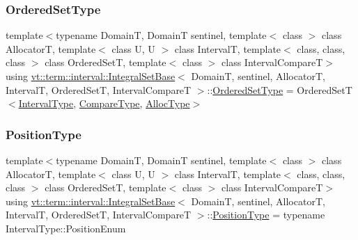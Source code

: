 \mbox{\label{structvt_1_1term_1_1interval_1_1_integral_set_base_af29bc3750493c7de4043f43ef7eb2ca2}} 
\subsubsection{\texorpdfstring{Ordered\+Set\+Type}{OrderedSetType}}
{\footnotesize\ttfamily template$<$typename DomainT, DomainT sentinel, template$<$ class $>$ class AllocatorT, template$<$ class U, U $>$ class IntervalT, template$<$ class, class, class $>$ class Ordered\+SetT, template$<$ class $>$ class Interval\+CompareT$>$ \\
using \hyperlink{structvt_1_1term_1_1interval_1_1_integral_set_base}{vt\+::term\+::interval\+::\+Integral\+Set\+Base}$<$ DomainT, sentinel, AllocatorT, IntervalT, Ordered\+SetT, Interval\+CompareT $>$\+::\hyperlink{structvt_1_1term_1_1interval_1_1_integral_set_base_af29bc3750493c7de4043f43ef7eb2ca2}{Ordered\+Set\+Type} =  Ordered\+SetT$<$\hyperlink{structvt_1_1term_1_1interval_1_1_integral_set_base_a1f8f5bb84064be35bbaaf15bb5a43f14}{Interval\+Type}, \hyperlink{structvt_1_1term_1_1interval_1_1_integral_set_base_a8788c1d68e2b4348c341c120363c95e7}{Compare\+Type}, \hyperlink{structvt_1_1term_1_1interval_1_1_integral_set_base_af699b4961903ebe28d478088eae9b60a}{Alloc\+Type}$>$}

\mbox{\label{structvt_1_1term_1_1interval_1_1_integral_set_base_a04700201180ff07417358d70c9ac5c82}} 
\subsubsection{\texorpdfstring{Position\+Type}{PositionType}}
{\footnotesize\ttfamily template$<$typename DomainT, DomainT sentinel, template$<$ class $>$ class AllocatorT, template$<$ class U, U $>$ class IntervalT, template$<$ class, class, class $>$ class Ordered\+SetT, template$<$ class $>$ class Interval\+CompareT$>$ \\
using \hyperlink{structvt_1_1term_1_1interval_1_1_integral_set_base}{vt\+::term\+::interval\+::\+Integral\+Set\+Base}$<$ DomainT, sentinel, AllocatorT, IntervalT, Ordered\+SetT, Interval\+CompareT $>$\+::\hyperlink{structvt_1_1term_1_1interval_1_1_integral_set_base_a04700201180ff07417358d70c9ac5c82}{Position\+Type} =  typename Interval\+Type\+::\+Position\+Enum}

